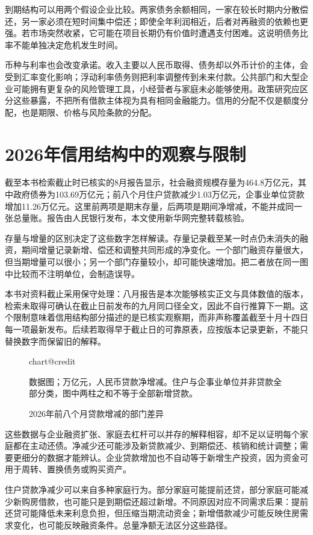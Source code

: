 \documentclass[UTF8,fontset=fandol,zihao=-4,oneside,openany]{ctexbook}
\makeatletter
\newcommand{\Chart}[3]{\begin{figure}[htbp]\centering\csname chart@#1\endcsname\caption{#2}\par\small #3\end{figure}}
\makeatother
\begin{document}
\label{arg:P102}
到期结构可以用两个假设企业比较。两家债务余额相同，一家在较长时期内分散偿还，另一家必须在短时间集中偿还；即使全年利润相近，后者对再融资的依赖也更强。若市场突然收紧，它可能在项目长期仍有价值时遭遇支付困难。这说明债务比率不能单独决定危机发生时间。

币种与利率也会改变承诺。收入主要以人民币取得、债务却以外币计价的主体，会受到汇率变化影响；浮动利率债务则把利率调整传到未来付款。公共部门和大型企业可能拥有更复杂的风险管理工具，小经营者与家庭未必能够使用。政策研究应区分这些暴露，不把所有借款主体视为具有相同金融能力。信用的分配不仅是额度分配，也是期限、价格与风险条款的分配。

\section{2026年信用结构中的观察与限制}
截至本书检索截止时已核实的8月报告显示，社会融资规模存量为464.8万亿元，其中政府债券为103.69万亿元；前八个月住户贷款减少1.03万亿元，企事业单位贷款增加11.26万亿元。这里前两项是期末存量，后两项是期间净增减，不能并成同一张总量账。报告由人民银行发布，本文使用新华网完整转载核验。\cite{Money2026}

\label{arg:P103}
存量与增量的区别决定了这些数字怎样解读。存量记录截至某一时点仍未消失的融资，期间增量记录新增、偿还和调整共同形成的净变化。一个部门融资存量很大，但当期增量可以很小；另一个部门存量较小，却可能快速增加。把二者放在同一图中比较而不注明单位，会制造误导。

本书对资料截止采用保守处理：八月报告是本次能够核实正文与具体数值的版本，检索未取得可确认在截止日前发布的九月同口径全文，因此不自行推算下一期。这个限制意味着信用结构部分描述的是已核实观察期，而非声称覆盖截至十月十四日每一项最新发布。后续若取得早于截止日的可靠原表，应按版本记录更新，不能只替换数字而保留旧的解释。

\Chart{credit}{2026年前八个月贷款增减的部门差异}{数据图；万亿元，人民币贷款净增减。住户与企事业单位并非贷款全部分类，图中两柱之和不等于全部新增贷款。\cite{Money2026}}

这些数据与企业融资扩张、家庭去杠杆可以并存的解释相容，却不足以证明每个家庭都在主动还债。净减少还可能涉及新贷款减少、到期偿还、核销和统计调整；需要更细分的数据才能辨认。企业贷款增加也不自动等于新增生产投资，因为资金可用于周转、置换债务或购买资产。

\label{arg:P104}
住户贷款净减少可以来自多种家庭行为。部分家庭可能提前还贷，部分家庭可能减少新购房借款，也可能只是到期偿还超过新增。不同原因对应不同需求后果：提前还贷可能降低未来利息负担，但压缩当期流动资金；新增借款减少可能反映住房需求变化，也可能反映融资条件。总量净额无法区分这些路径。
\end{document}
